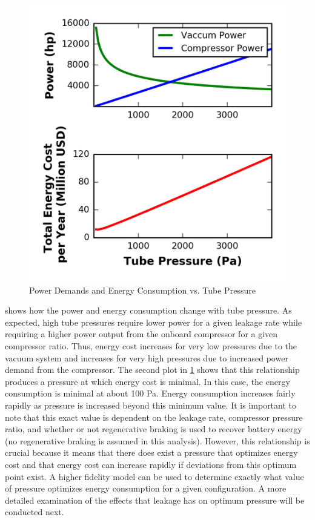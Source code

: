 \begin{figure}
	\centering
	\includegraphics{../../images/graphs/pressure_trades/pressure_vs_power.png}
	\caption{Power Demands and Energy Consumption vs. Tube Pressure}
	\label{fig:pow_demands_vs_tube_press}
\end{figure}
 shows how the power and energy consumption
change with tube pressure. As expected, high tube pressures require lower power
for a given leakage rate while requiring a higher power output from the onboard
compressor for a given compressor ratio. Thus, energy cost increases for very
low pressures due to the vacuum system and increases for very high pressures
due to increased power demand from the compressor.
The second plot in \cref{fig:pow_demands_vs_tube_press} shows that this
relationship produces a pressure at which energy cost is minimal. In this case,
the energy consumption is minimal at about 100 Pa. Energy consumption increases
fairly rapidly as pressure is increased beyond this minimum value. It is
important to note that this exact value is dependent on the leakage rate,
compressor pressure ratio, and whether or not regenerative braking is used to
recover battery energy (no regenerative braking is assumed in this analysis).
However, this relationship is crucial because it means that there does exist a
pressure that optimizes energy cost and that energy cost can increase rapidly
if deviations from this optimum point exist. A higher fidelity model can be
used to determine exactly what value of pressure optimizes energy consumption
for a given configuration. A more detailed examination of the effects that
leakage has on optimum pressure will be conducted next.
